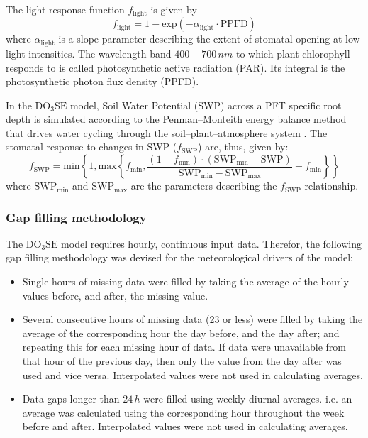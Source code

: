 \documentclass[bg, manuscript]{copernicus}
\begin{document}
The light response function $f_\mathrm{light}$ is given by
%
\begin{equation}
  f_\text{light} = 1-\text{exp}(-\alpha_\text{light}\cdot \text{PPFD})
  \label{eq:flight}
\end{equation}
%
where $\alpha_\mathrm{light}$ is a slope parameter describing the extent of stomatal opening at low light intensities. The wavelength band $400-700\,\unit{nm}$ to which plant chlorophyll responds to is called photosynthetic active radiation (PAR). Its integral is the photosynthetic photon flux density (PPFD).

In the $\mathrm{DO_3SE}$ model, Soil Water Potential (SWP) across a PFT specific root depth is simulated according to the Penman--Monteith energy balance method that drives water cycling through the soil--plant--atmosphere system \citep{ACP:Bueker2012}. The stomatal response to changes in SWP ($f_\mathrm{SWP}$) are, thus, given by:
%
\begin{equation}
  f_\mathrm{SWP} = \text{min}\left\{1, \text{max}\left\{f_\mathrm{min}, \frac{(1 - f_\mathrm{min})\cdot(\mathrm{SWP_{min}} - \mathrm{SWP})}{\mathrm{SWP_{min}} - \mathrm{SWP_{max}}} + f_\mathrm{min} \right\} \right\}
    \label{eq:fsw}
\end{equation}
%
where $\mathrm{SWP_{min}}$ and $\mathrm{SWP_{max}}$ are the parameters describing the $f_\mathrm{SWP}$ relationship.

\subsubsection{Gap filling methodology}
\label{subsec:gap_filling}
The $\mathrm{DO_3SE}$ model requires hourly, continuous input data. Therefor, the following gap filling methodology was devised for the meteorological drivers of the model:
\begin{itemize}
\item Single hours of missing data were filled by taking the average of the hourly values before, and after, the missing value.
\item Several consecutive hours of missing data (23 or less) were filled by taking the average of the corresponding hour the day before, and the day after; and repeating this for each missing hour of data. If data were unavailable from that hour of the previous day, then only the value from the day after was used and vice versa. Interpolated values were not used in calculating averages.
\item Data gaps longer than $24\,\unit{h}$ were filled using weekly diurnal averages. i.e. an average was calculated using the corresponding hour throughout the week before and after. Interpolated values were not used in calculating averages.
\end{itemize}
\end{document}
